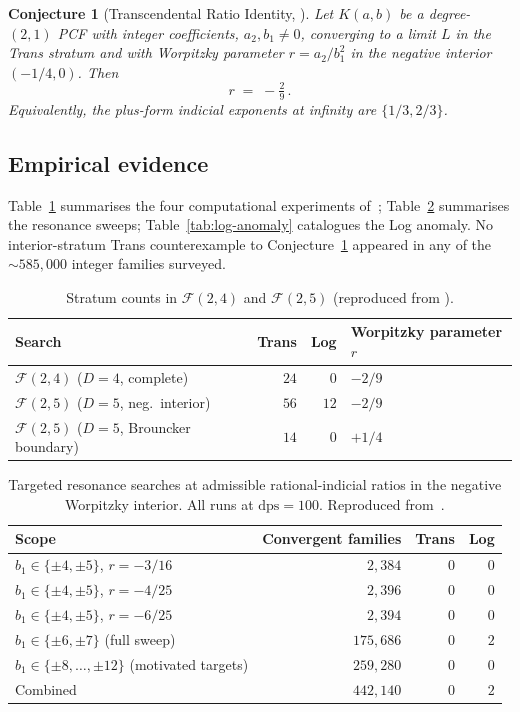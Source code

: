 \documentclass[11pt]{amsart}
\newtheorem{conjecture}[theorem]{Conjecture}
\theoremstyle{definition}
\theoremstyle{remark}
\newcommand{\FF}{\mathcal{F}}
\newcommand{\dps}{\mathrm{dps}}
\begin{document}
\begin{conjecture}[Transcendental Ratio Identity, \cite{TRINote}]
\label{conj:tri}
Let $K(a,b)$ be a degree-$(2,1)$ PCF with integer coefficients,
$a_2,b_1 \ne 0$, converging to a limit $L$ in the Trans stratum and
with Worpitzky parameter $r = a_2/b_1^2$ in the negative interior
$(-1/4,0)$.  Then
\[
  r \;=\; -\tfrac{2}{9}\,.
\]
Equivalently, the plus-form indicial exponents at infinity are
$\{1/3,2/3\}$.
\end{conjecture}

\subsection{Empirical evidence}\label{sec:evidence}

Table~\ref{tab:censuses} summarises the four computational
experiments of~\cite{TRINote}; Table~\ref{tab:resonance} summarises
the resonance sweeps; Table~\ref{tab:log-anomaly} catalogues the Log
anomaly.  No interior-stratum Trans counterexample to
Conjecture~\ref{conj:tri} appeared in any of the
$\sim\!585{,}000$ integer families surveyed.

\begin{table}[t]
\centering
\caption{Stratum counts in $\FF(2,4)$ and $\FF(2,5)$
(reproduced from \cite{TRINote}).}
\label{tab:censuses}
\begin{tabular}{lrrl}
\toprule
Search & Trans & Log & Worpitzky parameter $r$ \\
\midrule
$\FF(2,4)$ ($D=4$, complete)
  & $24$ & $0$  & $-2/9$ \\
$\FF(2,5)$ ($D=5$, neg.\ interior)
  & $56$ & $12$ & $-2/9$ \\
$\FF(2,5)$ ($D=5$, Brouncker boundary)
  & $14$ & $0$  & $+1/4$ \\
\bottomrule
\end{tabular}
\end{table}

\begin{table}[t]
\centering
\caption{Targeted resonance searches at admissible rational-indicial
ratios in the negative Worpitzky interior. All runs at $\dps=100$.
Reproduced from~\cite{TRINote}.}
\label{tab:resonance}
\begin{tabular}{lrrr}
\toprule
Scope & Convergent families & Trans & Log \\
\midrule
$b_1\in\{\pm4,\pm5\}$, $r=-3/16$ & $2{,}384$ & $0$ & $0$ \\
$b_1\in\{\pm4,\pm5\}$, $r=-4/25$ & $2{,}396$ & $0$ & $0$ \\
$b_1\in\{\pm4,\pm5\}$, $r=-6/25$ & $2{,}394$ & $0$ & $0$ \\
\midrule
$b_1\in\{\pm6,\pm7\}$ (full sweep) & $175{,}686$ & $0$ & $2$ \\
$b_1\in\{\pm8,\dots,\pm12\}$ (motivated targets)
                                 & $259{,}280$ & $0$ & $0$ \\
\midrule
Combined                          & $442{,}140$ & $0$ & $2$ \\
\bottomrule
\end{tabular}
\end{table}
\end{document}
